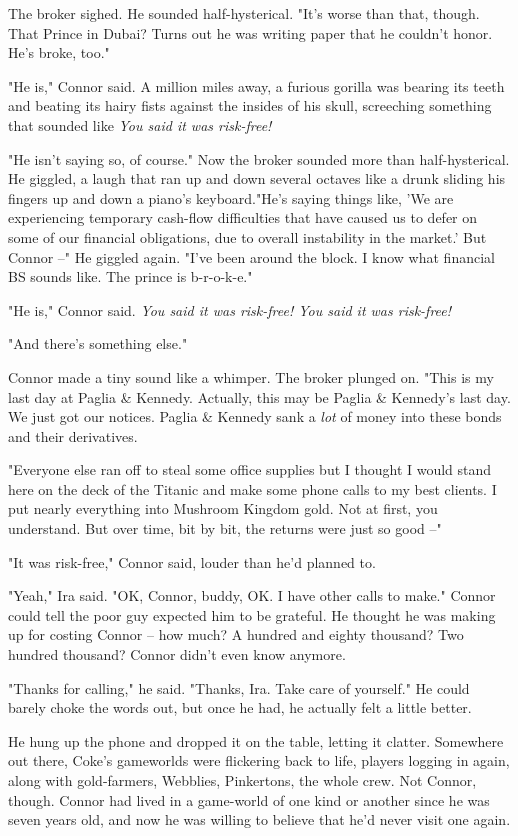 The broker sighed. He sounded half-hysterical. "It's worse than
that, though. That Prince in Dubai? Turns out he was writing paper
that he couldn't honor. He's broke, too."

"He is," Connor said. A million miles away, a furious gorilla was
bearing its teeth and beating its hairy fists against the insides
of his skull, screeching something that sounded like
\emph{You said it was risk-free!}

"He isn't saying so, of course." Now the broker sounded more than
half-hysterical. He giggled, a laugh that ran up and down several
octaves like a drunk sliding his fingers up and down a piano's
keyboard."He's saying things like, 'We are experiencing temporary
cash-flow difficulties that have caused us to defer on some of our
financial obligations, due to overall instability in the market.'
But Connor --" He giggled again. "I've been around the block. I
know what financial BS sounds like. The prince is b-r-o-k-e."

"He is," Connor said.
\emph{You said it was risk-free! You said it was risk-free!}

"And there's something else."

Connor made a tiny sound like a whimper. The broker plunged on.
"This is my last day at Paglia \& Kennedy. Actually, this may be
Paglia \& Kennedy's last day. We just got our notices. Paglia \&
Kennedy sank a \emph{lot} of money into these bonds and their
derivatives.

"Everyone else ran off to steal some office supplies but I thought
I would stand here on the deck of the Titanic and make some phone
calls to my best clients. I put nearly everything into Mushroom
Kingdom gold. Not at first, you understand. But over time, bit by
bit, the returns were just so good --"

"It was risk-free," Connor said, louder than he'd planned to.

"Yeah," Ira said. "OK, Connor, buddy, OK. I have other calls to
make." Connor could tell the poor guy expected him to be grateful.
He thought he was making up for costing Connor -- how much? A
hundred and eighty thousand? Two hundred thousand? Connor didn't
even know anymore.

"Thanks for calling," he said. "Thanks, Ira. Take care of
yourself." He could barely choke the words out, but once he had, he
actually felt a little better.

He hung up the phone and dropped it on the table, letting it
clatter. Somewhere out there, Coke's gameworlds were flickering
back to life, players logging in again, along with gold-farmers,
Webblies, Pinkertons, the whole crew. Not Connor, though. Connor
had lived in a game-world of one kind or another since he was seven
years old, and now he was willing to believe that he'd never visit
one again.

